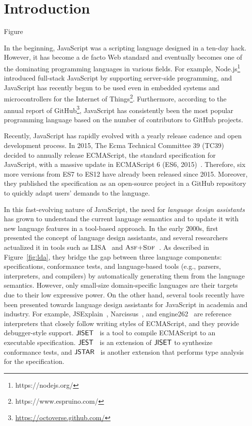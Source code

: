 \section{Introduction}\label{sec:intro}

\todo Figure

In the beginning, JavaScript was a scripting language designed in a ten-day
hack. However, it has become a de facto Web standard and eventually becomes one
of the dominating programming languages in various fields. For example,
Node.js\footnote{https://nodejs.org/} introduced full-stack JavaScript by
supporting server-side programming, and JavaScript has recently begun to be used
even in embedded systems and microcontrollers for the Internet of
Things\footnote{https://www.espruino.com/}. Furthermore, according to the annual
report of GitHub\footnote{\url{https://octoverse.github.com/}}, JavaScript has
consistently been the most popular programming language based on the number of
contributors to GitHub projects.

Recently, JavaScript has rapidly evolved with a yearly release cadence and open
development process. In 2015, The Ecma Technical Committee 39 (TC39) decided to
annually release ECMAScript, the standard specification for JavaScript, with a
massive update in ECMAScript 6 (ES6, 2015)~\cite{es6}. Therefore, six more
versions from ES7 to ES12 have already been released since 2015. Moreover, they
published the specification as an open-source project in a GitHub repository to
quickly adapt users' demands to the language.

In this fast-evolving nature of JavaScript, the need for \textit{language design
assistants}~\cite{lda} has grown to understand the current language semantics
and to update it with new language features in a tool-based approach. In the
early 2000s, \citet{lda} first presented the concept of language design
assistants, and several researchers actualized it in tools such as
LISA~\cite{lisa} and $\textsc{Asf+Sdf}$~\cite{asf-sdf, meta-env}. As described in
Figure~\ref{fig:lda}, they bridge the gap between three language components:
specifications, conformance tests, and language-based tools (e.g., parsers,
interpreters, and compilers) by automatically generating them from the language
semantics. However, only small-size domain-specific languages are their targets
due to their low expressive power. On the other hand, several tools recently
have been presented towards language design assistants for JavaScript in
academia and industry. For example, JSExplain~\cite{jsexplain},
Narcissus~\cite{narcissus}, and engine262~\cite{engine262} are reference
interpreters that closely follow writing styles of ECMAScript, and they provide
debugger-style support. $\textsf{JISET}$~\cite{jiset} is a tool to compile ECMAScript to
an executable specification. $\textsf{JEST}$~\cite{jest} is an extension of $\textsf{JISET}$ to
synthesize conformance tests, and $\textsf{JSTAR}$~\cite{jstar} is another extension
that performs type analysis for the specification.

